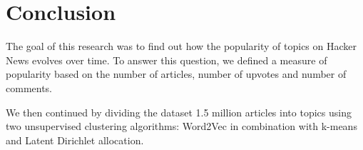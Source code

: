 \section{Conclusion}
The goal of this research was to find out how the popularity of topics on Hacker News evolves over time. To answer this question, we defined a measure of popularity based on the number of articles, number of upvotes and number of comments.

We then continued by dividing the dataset 1.5 million articles into topics using two unsupervised clustering algorithms: Word2Vec in combination with k-means and Latent Dirichlet allocation.